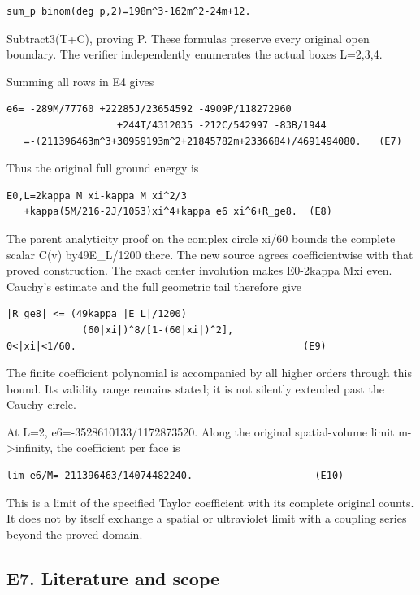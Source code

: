 \documentclass[11pt,a4paper]{article}
\renewcommand{\[}{\begingroup\small\originaldisplaystart}
\renewcommand{\]}{\originaldisplayend\endgroup}
\begin{document}
\begin{verbatim}
sum_p binom(deg p,2)=198m^3-162m^2-24m+12.
\end{verbatim}

Subtract3(T+C), proving P. These formulas preserve every original open
boundary. The verifier independently enumerates the actual boxes
L=2,3,4.

Summing all rows in E4 gives

\begin{verbatim}
e6= -289M/77760 +22285J/23654592 -4909P/118272960
                   +244T/4312035 -212C/542997 -83B/1944
   =-(211396463m^3+30959193m^2+21845782m+2336684)/4691494080.   (E7)
\end{verbatim}

Thus the original full ground energy is

\begin{verbatim}
E0,L=2kappa M xi-kappa M xi^2/3
   +kappa(5M/216-2J/1053)xi^4+kappa e6 xi^6+R_ge8.  (E8)
\end{verbatim}

The parent analyticity proof on the complex circle
\textbar xi/60 bounds the complete scalar C(v)
by49\textbar E\_L\textbar/1200 there. The new source agrees
coefficientwise with that proved construction. The exact center
involution makes E0-2kappa Mxi even. Cauchy's estimate and the full
geometric tail therefore give

\begin{verbatim}
|R_ge8| <= (49kappa |E_L|/1200)
             (60|xi|)^8/[1-(60|xi|)^2],
0<|xi|<1/60.                                       (E9)
\end{verbatim}

The finite coefficient polynomial is accompanied by all higher orders
through this bound. Its validity range remains stated; it is not
silently extended past the Cauchy circle.

At L=2, e6=-3528610133/1172873520. Along the original spatial-volume
limit m-\textgreater infinity, the coefficient per face is

\begin{verbatim}
lim e6/M=-211396463/14074482240.                     (E10)
\end{verbatim}

This is a limit of the specified Taylor coefficient with its complete
original counts. It does not by itself exchange a spatial or ultraviolet
limit with a coupling series beyond the proved domain.

\subsection{E7. Literature and scope}\label{e7.-literature-and-scope}
\end{document}
